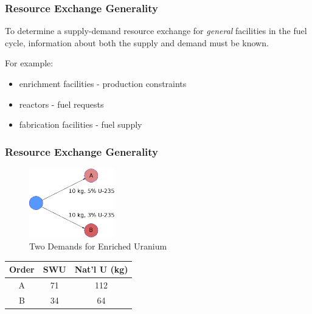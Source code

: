 
\begin{frame}[ctb!]
  \frametitle{Resource Exchange Generality}

  To determine a supply-demand resource exchange for \textit{general} facilities
  in the fuel cycle, information about both the supply and demand must be known.

  \vspace{0.2cm}
  
  For example:
  \begin{itemize}
    \item enrichment facilities - production constraints
    \item reactors - fuel requests
    \item fabrication facilities - fuel supply
  \end{itemize}
  
\end{frame}

\begin{frame}[ctb!]
  \frametitle{Resource Exchange Generality}

  \begin{figure}
    \includegraphics[height=3cm]{./images/enr.eps}
    \caption{Two Demands for Enriched Uranium}
  \end{figure}
  
  \begin{table} [h!]
    \begin{tabular}{|c|c|c|}
      \hline  
      Order & SWU & Nat'l U (kg) \\
      \hline  
      A & 71 & 112\\
      B & 34 & 64\\
      \hline  
    \end{tabular}
  \end{table}

\end{frame}




